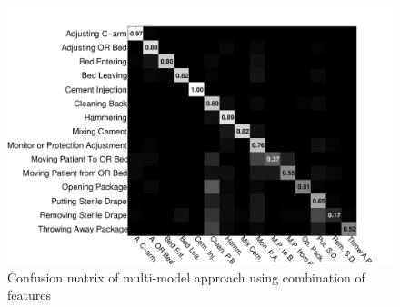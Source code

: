 \documentclass[a4paper, 10pt, conference]{ieeeconf}      %
\begin{document}
        

\begin{figure}[H]%
\begin{center}
\includegraphics[scale=0.20]{Figures/comb-multimodel}
\end{center}
\caption{Confusion matrix of multi-model approach using combination of features  
\label{fig:combinationMultiModelConfusionMatrix}}
\end{figure}
            
            
            
\end{document}
